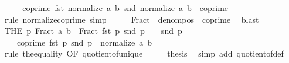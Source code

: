 \begin{isabellebody}
\ \ \isamarkupfalse%
\ \isamarkupfalse%
\ {\isachardoublequoteopen}coprime\ {\isacharparenleft}{\kern0pt}fst\ {\isacharparenleft}{\kern0pt}normalize\ {\isacharparenleft}{\kern0pt}a{\isacharcomma}{\kern0pt}\ b{\isacharparenright}{\kern0pt}{\isacharparenright}{\kern0pt}{\isacharparenright}{\kern0pt}\ {\isacharparenleft}{\kern0pt}snd\ {\isacharparenleft}{\kern0pt}normalize\ {\isacharparenleft}{\kern0pt}a{\isacharcomma}{\kern0pt}\ b{\isacharparenright}{\kern0pt}{\isacharparenright}{\kern0pt}{\isacharparenright}{\kern0pt}{\isachardoublequoteclose}\ {\isacharparenleft}{\kern0pt}\ {\isacharquery}{\kern0pt}coprime{\isacharparenright}{\kern0pt}\isanewline
\ \ \ \ \isamarkupfalse%
\ {\isacharparenleft}{\kern0pt}rule\ normalize{\isacharunderscore}{\kern0pt}coprime{\isacharparenright}{\kern0pt}\ simp\isanewline
\ \ \isamarkupfalse%
\ \isamarkupfalse%
\ {\isachardoublequoteopen}{\isacharquery}{\kern0pt}Fract\ {\isasymand}\ {\isacharquery}{\kern0pt}denom{\isacharunderscore}{\kern0pt}pos\ {\isasymand}\ {\isacharquery}{\kern0pt}coprime{\isachardoublequoteclose}\ \isamarkupfalse%
\ blast\isanewline
\ \ \isamarkupfalse%
\ \isamarkupfalse%
\ {\isachardoublequoteopen}{\isacharparenleft}{\kern0pt}THE\ p{\isachardot}{\kern0pt}\ Fract\ a\ b\ {\isacharequal}{\kern0pt}\ Fract\ {\isacharparenleft}{\kern0pt}fst\ p{\isacharparenright}{\kern0pt}\ {\isacharparenleft}{\kern0pt}snd\ p{\isacharparenright}{\kern0pt}\ {\isasymand}\ {}\ {\isacharless}{\kern0pt}\ snd\ p\ {\isasymand}\isanewline
\ \ \ \ coprime\ {\isacharparenleft}{\kern0pt}fst\ p{\isacharparenright}{\kern0pt}\ {\isacharparenleft}{\kern0pt}snd\ p{\isacharparenright}{\kern0pt}{\isacharparenright}{\kern0pt}\ {\isacharequal}{\kern0pt}\ normalize\ {\isacharparenleft}{\kern0pt}a{\isacharcomma}{\kern0pt}\ b{\isacharparenright}{\kern0pt}{\isachardoublequoteclose}\isanewline
\ \ \ \ \isamarkupfalse%
\ {\isacharparenleft}{\kern0pt}rule\ the{}{\isacharunderscore}{\kern0pt}equality\ {\isacharbrackleft}{\kern0pt}OF\ quotient{\isacharunderscore}{\kern0pt}of{\isacharunderscore}{\kern0pt}unique{\isacharbrackright}{\kern0pt}{\isacharparenright}{\kern0pt}\isanewline
\ \ \isamarkupfalse%
\ \isamarkupfalse%
\ {\isacharquery}{\kern0pt}thesis\ \isamarkupfalse%
\ {\isacharparenleft}{\kern0pt}simp\ add{\isacharcolon}{\kern0pt}\ quotient{\isacharunderscore}{\kern0pt}of{\isacharunderscore}{\kern0pt}def{\isacharparenright}{\kern0pt}\isanewline

\end{isabellebody}
